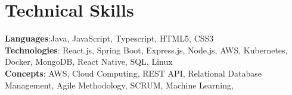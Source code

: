 \section{Technical Skills}
    \begin{itemize}[leftmargin=0.15in, label={}]
	\small{\item{
		\textbf{Languages}{:Java, JavaScript, Typescript, HTML5, CSS3} \\
		\textbf{Technologies}{: React.js, Spring Boot, Express.js, Node.js, AWS, Kubernetes, Docker, MongoDB, React Native, SQL, Linux} \\
		\textbf{Concepts}{: AWS,  Cloud Computing, REST API, Relational Database Management, Agile Methodology, SCRUM, Machine Learning, }
	}}
    \end{itemize}